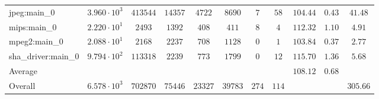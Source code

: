 \begin{tabular}{|l|c|c|c|c|c|c|c|c|c|c|}
jpeg:main\_0            & $ 3.960 \cdot 10^{3}  $ & $ 413544 $ & $ 14357 $ & $ 4722  $ & $ 8690  $ & $ 7   $ & $ 58  $ & $ 104.44      $ & $ 0.43    $ & $ 41.48   $ \\
mips:main\_0            & $ 2.220 \cdot 10^{1}  $ & $ 2493   $ & $ 1392  $ & $ 408   $ & $ 411   $ & $ 8   $ & $ 4   $ & $ 112.32      $ & $ 1.10    $ & $ 4.91    $ \\
mpeg2:main\_0           & $ 2.088 \cdot 10^{1}  $ & $ 2168   $ & $ 2237  $ & $ 708   $ & $ 1128  $ & $ 0   $ & $ 1   $ & $ 103.84      $ & $ 0.37    $ & $ 2.77    $ \\
sha\_driver:main\_0     & $ 9.794 \cdot 10^{2}  $ & $ 113318 $ & $ 2239  $ & $ 773   $ & $ 1799  $ & $ 0   $ & $ 12  $ & $ 115.70      $ & $ 1.36    $ & $ 5.68    $ \\
\hline
Average                 & $                     $ & $        $ & $       $ & $       $ & $       $ & $     $ & $     $ & $ 108.12      $ & $ 0.68    $ & $         $ \\
\hline
Overall                 & $ 6.578 \cdot 10^{3}  $ & $ 702870 $ & $ 75446 $ & $ 23327 $ & $ 39783 $ & $ 274 $ & $ 114 $ & $             $ & $         $ & $ 305.66  $ \\
\hline
\end{tabular}
